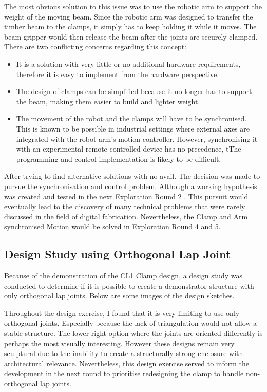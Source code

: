 The most obvious solution to this issue was to use the robotic arm to support the weight of the moving beam. Since the robotic arm was designed to transfer the timber beam to the clamps, it simply has to keep holding it while it moves. The beam gripper would then release the beam after the joints are securely clamped. There are two conflicting concerns regarding this concept:
\begin{itemize}
    \item It is a solution with very little or no additional hardware requirements, therefore it is easy to implement from the hardware perspective.
    \item The design of clamps can be simplified because it no longer has to support the beam, making them easier to build and lighter weight.
    \item The movement of the robot and the clamps will have to be synchronised. This is known to be possible in industrial settings where external axes are integrated with the robot arm’s motion controller. However, synchronising it with an experimental remote-controlled device has no precedence, tThe programming and control implementation is likely to be difficult.
\end{itemize}
After trying to find alternative solutions with no avail. The decision was made to pursue the synchronisation and control problem. Although a working hypothesis was created and tested in the next Exploration Round 2 . This pursuit would eventually lead to the discovery of many technical problems that were rarely discussed in the field of digital fabrication. Nevertheless, the Clamp and Arm synchronised Motion would be solved in Exploration Round 4 and 5.

\subsection{Design Study using Orthogonal Lap Joint}
\label{subsection:exploration-1-design-study-using-orthogonal-lap-joint}

Because of the demonstration of the CL1 Clamp design, a design study was conducted to determine if it is possible to create a demonstrator structure with only orthogonal lap joints. Below are some images of the design sketches.  


Throughout the design exercise, I found that it is very limiting to use only orthogonal joints. Especially because the lack of triangulation would not allow a stable structure. The lower right option where the joints are oriented differently is perhaps the most visually interesting. However these designs remain very sculptural due to the inability to create a structurally strong enclosure with architectural relevance. 
Nevertheless, this design exercise served to inform the development in the next round to prioritise redesigning the clamp to handle non-orthogonal lap joints.
